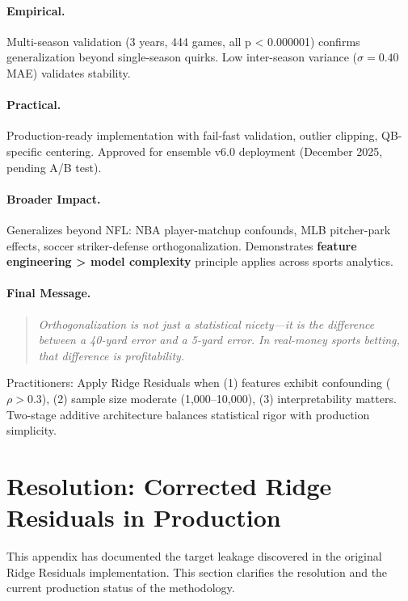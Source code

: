 \paragraph{Empirical.}
Multi-season validation (3 years, 444 games, all p < 0.000001) confirms generalization beyond single-season quirks. Low inter-season variance ($\sigma = 0.40$ MAE) validates stability.

\paragraph{Practical.}
Production-ready implementation with fail-fast validation, outlier clipping, QB-specific centering. Approved for ensemble v6.0 deployment (December 2025, pending A/B test).

\paragraph{Broader Impact.}
Generalizes beyond NFL: NBA player-matchup confounds, MLB pitcher-park effects, soccer striker-defense orthogonalization. Demonstrates \textbf{feature engineering > model complexity} principle applies across sports analytics.

\paragraph{Final Message.}
\begin{quote}
\emph{Orthogonalization is not just a statistical nicety---it is the difference between a 40-yard error and a 5-yard error. In real-money sports betting, that difference is profitability.}
\end{quote}

Practitioners: Apply Ridge Residuals when (1) features exhibit confounding ($\rho > 0.3$), (2) sample size moderate (1,000--10,000), (3) interpretability matters. Two-stage additive architecture balances statistical rigor with production simplicity.

\section{Resolution: Corrected Ridge Residuals in Production}
\label{sec:ridge-residuals-corrected}

This appendix has documented the target leakage discovered in the original Ridge Residuals implementation. This section clarifies the resolution and the current production status of the methodology.

